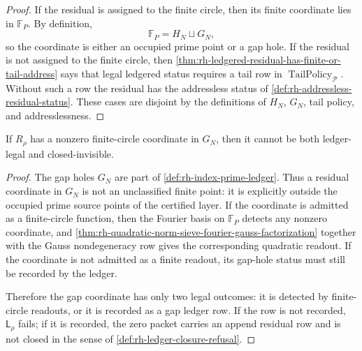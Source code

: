 \begin{proof}
If the residual is assigned to the finite circle, then its finite
coordinate lies in $\mathbb F_P$.  By definition,
$$
\mathbb F_P=H_N\sqcup G_N,
$$
so the coordinate is either an occupied prime point or a gap hole.  If
the residual is not assigned to the finite circle, then
\autoref{thm:rh-ledgered-residual-has-finite-or-tail-address} says that
legal ledgered status requires a tail row in
$\operatorname{TailPolicy}_{\mathcal P}$.  Without such a row the
residual has the addressless status of
\autoref{def:rh-addressless-residual-status}.  These cases are
disjoint by the definitions of $H_N$, $G_N$, tail policy, and
addresslessness.
\end{proof}

\begin{theorem}
\label{thm:rh-gap-hole-address-cannot-close-silently}
If $R_\rho$ has a nonzero finite-circle coordinate in $G_N$, then it
cannot be both ledger-legal and closed-invisible.
\end{theorem}

\begin{proof}
The gap holes $G_N$ are part of
\autoref{def:rh-index-prime-ledger}.  Thus a residual coordinate in
$G_N$ is not an unclassified finite point: it is explicitly outside
the occupied prime source points of the certified layer.  If the
coordinate is admitted as a finite-circle function, then the Fourier
basis on $\mathbb F_P$ detects any nonzero coordinate, and
\autoref{thm:rh-quadratic-norm-sieve-fourier-gauss-factorization}
together with the Gauss nondegeneracy row gives the corresponding
quadratic readout.  If the coordinate is not admitted as a finite
readout, its gap-hole status must still be recorded by the ledger.

Therefore the gap coordinate has only two legal outcomes: it is detected
by finite-circle readouts, or it is recorded as a gap ledger row.  If
the row is not recorded, $\mathsf L_\rho$ fails; if it is recorded, the
zero packet carries an append residual row and is not closed in the
sense of \autoref{def:rh-ledger-closure-refusal}.
\end{proof}

